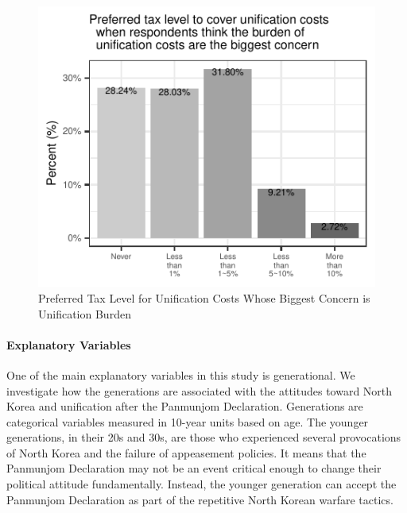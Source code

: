 \documentclass[letterpaper,9pt,twocolumn,twoside,]{pinp}
\begin{document}
\begin{figure}[htbp]

{\centering \includegraphics{manuscript_files/figure-latex/fig6-1} 

}

\caption{\label{fig6} Preferred Tax Level for Unification Costs Whose Biggest Concern is Unification Burden}\label{fig:fig6}
\end{figure}

\hypertarget{explanatory-variables}{%
\paragraph{Explanatory Variables}\label{explanatory-variables}}

One of the main explanatory variables in this study is generational. We
investigate how the generations are associated with the attitudes toward
North Korea and unification after the Panmunjom Declaration. Generations
are categorical variables measured in 10-year units based on age. The
younger generations, in their 20s and 30s, are those who experienced
several provocations of North Korea and the failure of appeasement
policies. It means that the Panmunjom Declaration may not be an event
critical enough to change their political attitude fundamentally.
Instead, the younger generation can accept the Panmunjom Declaration as
part of the repetitive North Korean warfare tactics.
\end{document}
